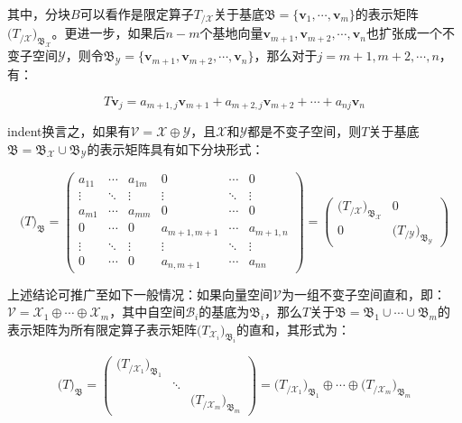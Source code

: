 \documentclass[UTF8,nofonts]{ctexart}
\begin{document}
其中，分块$B$可以看作是限定算子$T_{/\mathcal{X}}$关于基底$\mathfrak{B}=\{\boldsymbol{v}_1,\cdots,\boldsymbol{v}_m\}$的表示矩阵$\Big(T_{/\mathcal{X}}\Big)_{\mathfrak{B}_\mathcal{X}}$。更进一步，如果后$n-m$个基地向量$\boldsymbol{v}_{m+1},\boldsymbol{v}_{m+2},\cdots,\boldsymbol{v}_{n}$也扩张成一个不变子空间$\mathcal{Y}$，则令$\mathfrak{B}_\mathcal{Y}=\{\boldsymbol{v}_{m+1},\boldsymbol{v}_{m+2},\cdots,\boldsymbol{v}_{n}\}$，那么对于$j=m+1,m+2,\cdots,n$，有：

\[
T\boldsymbol{v}_{j}=a_{m+1,j}\boldsymbol{v}_{m+1}+a_{m+2,j}\boldsymbol{v}_{m+2}+\cdots+a_{nj}\boldsymbol{v}_{n}
\]

indent换言之，如果有$\mathcal{V}=\mathcal{X}\oplus\mathcal{Y}$，且$\mathcal{X}$和$\mathcal{Y}$都是不变子空间，则$T$关于基底$\mathfrak{B}=\mathfrak{B}_\mathcal{X}\cup\mathfrak{B}_\mathcal{Y}$的表示矩阵具有如下分块形式：

\[
\Big(T\Big)_{\mathfrak{B}}=
\begin{pmatrix}
a_{11} & \cdots & a_{1m} & 0 & \cdots & 0 \\
\vdots & \ddots & \vdots & \vdots & \ddots & \vdots \\
a_{m1} & \cdots & a_{mm} & 0 & \cdots & 0 \\
0 & \cdots & 0 & a_{m+1,m+1} & \cdots & a_{m+1,n} \\
\vdots & \ddots & \vdots & \vdots & \ddots & \vdots \\
0 & \cdots & 0 & a_{n,m+1} & \cdots & a_{nn}
\end{pmatrix}=
\begin{pmatrix}
\Big(T_{/\mathcal{X}}\Big)_{\mathfrak{B}_{\mathcal{X}}} & 0 \\
0 & \Big(T_{/\mathcal{Y}}\Big)_{\mathfrak{B}_{\mathcal{Y}}}
\end{pmatrix}
\]

上述结论可推广至如下一般情况：如果向量空间$\mathcal{V}$为一组不变子空间直和，即：$\mathcal{V}=\mathcal{X}_1\oplus\cdots\oplus\mathcal{X}_m$，其中自空间$\mathcal{B}_i$的基底为$\mathfrak{B}_i$，那么$T$关于$\mathfrak{B}=\mathfrak{B}_1\cup\cdots\cup\mathfrak{B}_m$的表示矩阵为所有限定算子表示矩阵$\big(T_{\mathcal{X}_i}\big)_{\mathfrak{B}_i}$的直和，其形式为：

\[
\Big(T\Big)_{\mathfrak{B}}=
\begin{pmatrix}
\big(T_{/\mathcal{X}_1}\big)_{\mathfrak{B}_{1}} & ~ & ~ \\
~ & \ddots & ~ \\
~ & ~ & \big(T_{/\mathcal{X}_m}\big)_{\mathfrak{B}_{m}}
\end{pmatrix}=
\big(T_{/\mathcal{X}_1}\big)_{\mathfrak{B}_{1}}\oplus\cdots\oplus\big(T_{/\mathcal{X}_m}\big)_{\mathfrak{B}_{m}}
\]
\end{document}
